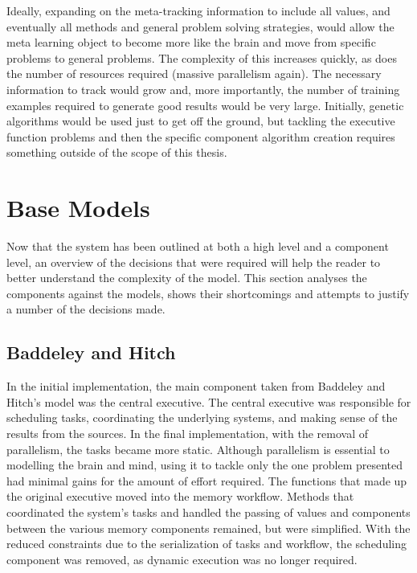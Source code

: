 Ideally, expanding on the meta-tracking information to include all values, and
eventually all methods and general problem solving strategies, would allow the
meta learning object to become more like the brain and move from specific
problems to general problems.  The complexity of this increases quickly, as does
the number of resources required (massive parallelism again). The necessary
information to track would grow and, more importantly, the number of training
examples required to generate good results would be very large.
Initially, genetic algorithms would be used just to get off the ground, but tackling the
executive function problems and then the specific component algorithm creation
requires something outside of the scope of this thesis.

\section{Base Models}

Now that the system has been outlined at both a high level and a component
level, an overview of the decisions that were required will help the reader to better
understand the complexity of the model. This section analyses the components
against the models, shows their shortcomings and attempts to justify a number
of the decisions made.

\subsection{Baddeley and Hitch}

In the initial implementation, the main component taken from Baddeley and
Hitch's model was the central executive.  The central executive was responsible
for scheduling tasks, coordinating the underlying systems, and making sense of
the results from the sources.  In the final implementation, with the removal of
parallelism, the tasks became more static.  Although parallelism is essential to 
modelling the brain and mind, using it to tackle only the one problem presented 
had minimal gains for the amount of effort required. The functions that made up the
original executive moved into the memory workflow.  Methods that
coordinated the system's tasks and handled the passing of values and components
between the various memory components remained, but were simplified.  With the
reduced constraints due to the serialization of tasks and workflow, the
scheduling component was removed, as dynamic execution was no
longer required.

